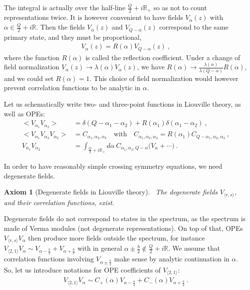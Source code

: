 \documentclass[12pt, a4paper]{article}
\theoremstyle{break}
\newtheorem{hyp}[exo]{Axiom}
\begin{document}
The integral is actually over the half-line $\frac{Q}{2}+i\mathbb{R}_+$ so as not to count representations twice. 
It is however convenient to have fields $V_\alpha(z)$ with $\alpha \in \frac{Q}{2}+i\mathbb{R}$. 
Then the fields $V_\alpha(z)$ and $V_{Q-\alpha}(z)$ correspond to the same primary state, and they must be proportional, 
\begin{align}
 V_\alpha(z) = R(\alpha) V_{Q-\alpha}(z)\ ,
\end{align}
where the function $R(\alpha)$ is called the reflection coefficient.
Under a change of field normalization $V_\alpha(z) \to \lambda(\alpha)V_\alpha(z)$, we have $R(\alpha) \to \frac{\lambda(\alpha)}{\lambda(Q-\alpha)} R(\alpha)$, and we could set $R(\alpha)=1$. 
This choice of field normalization would however prevent correlation functions to be analytic in $\alpha$.

Let us schematically write two- and three-point functions in Liouville theory, as well as OPEs:
\begin{align}
 \Big< V_{\alpha_1}V_{\alpha_2} \Big>  &=  \delta(Q-\alpha_1-\alpha_2) + R(\alpha_1)\delta(\alpha_1-\alpha_2)\ ,
 \label{eq:vv}
 \\
 \Big< V_{\alpha_1}V_{\alpha_2}V_{\alpha_3} \Big> & = C_{\alpha_1,\alpha_2,\alpha_3} \quad \text{with} \quad C_{\alpha_1,\alpha_2,\alpha_3} = R(\alpha_1) C_{Q-\alpha_1,\alpha_2,\alpha_3}\ ,
 \\
 V_{\alpha_1}V_{\alpha_2} &= \int_{\frac{Q}{2}+i\mathbb{R}_+} d\alpha\ C_{\alpha_1,\alpha_2,Q-\alpha} \Big( V_\alpha + \cdots\Big)\ .
 \label{eq:v1v2}
\end{align}

In order to have reasonably simple crossing symmetry equations, we need degenerate fields. 
\begin{hyp}[Degenerate fields in Liouville theory]
 ~\label{hyp:degl}
 The degenerate fields $V_{\langle r, s\rangle}$, and their correlation functions, exist. 
\end{hyp}
Degenerate fields do not correspond to states in the spectrum, as the spectrum is made of Verma modules (not degenerate representations). 
On top of that, 
OPEs $V_{\langle r, s\rangle}V_\alpha$ then produce more fields outside the spectrum, for instance 
$V_{\langle 2, 1\rangle} V_\alpha \sim V_{\alpha-\frac{b}{2}} + V_{\alpha+\frac{b}{2}}$ with in general $\alpha\pm\frac{b}{2}\notin \frac{Q}{2}+i\mathbb{R}$. We assume that correlation functions involving $V_{\alpha\pm\frac{b}{2}}$ make sense by analytic continuation in $\alpha$. So, let us introduce notations for OPE coefficients of $V_{\langle 2, 1\rangle}$:
\begin{align}
 V_{\langle 2, 1\rangle} V_\alpha \sim C_+(\alpha) V_{\alpha-\frac{b}{2}} + C_-(\alpha)V_{\alpha +\frac{b}{2}}\ .
\end{align}
\end{document}
